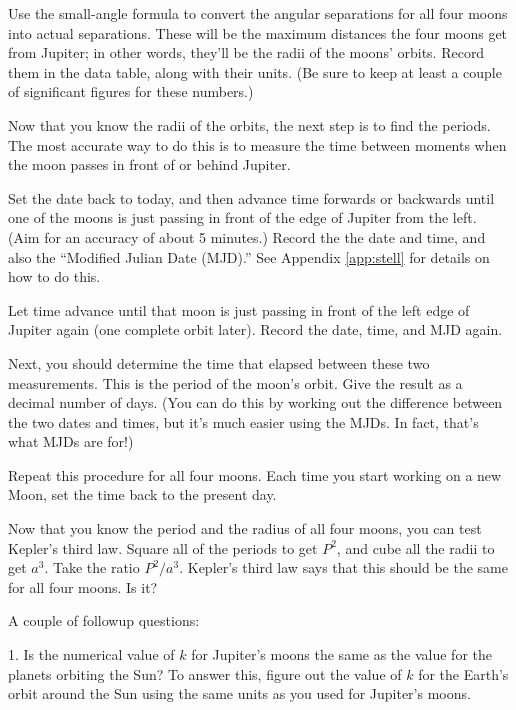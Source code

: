 \vskip 1in

Use the small-angle formula to convert the angular separations
for all four moons into actual separations.  These will be the
maximum distances the four moons get from Jupiter; in other words,
they'll be the radii of the moons' orbits.  Record them in the data table,
along with their units. (Be sure to keep at least a couple of significant
figures for these numbers.)

Now that you know the radii of the orbits, the next step is to find the
periods.  The most accurate way to do this is to measure the time between
moments when the moon passes in front of or behind Jupiter.

Set the date back to today, and then advance time
forwards or backwards until one of the moons is just
passing in front of the edge of Jupiter from the left.  (Aim for
an accuracy of about 5 minutes.)  Record
the the date and time, and also the ``Modified Julian Date (MJD).''
See Appendix \ref{app:stell} for details on how to do this.

Let time advance until that moon
is just passing in front of the left edge of Jupiter again (one complete
orbit later).  Record the date, time, and MJD again.  

Next, you should determine the time that elapsed
between these two measurements.  This is the period of the moon's orbit.
Give the result as a decimal number of days. (You can do this by working
out the difference between the two dates and times, but it's much easier
using the MJDs. In fact, that's what MJDs are for!)

Repeat this procedure for all four moons. Each time you start working on a
new Moon, set the time back to the present day.

Now that you know the period and the radius of all four moons,
you can test Kepler's third law.  Square all of the periods to get $P^2$,
and cube all the radii to get $a^3$.  Take the ratio $P^2/a^3$.
Kepler's third law says that this should be the same for all four
moons.  Is it?

\vskip 1in

A couple of followup questions:

1. Is the numerical value of $k$ for Jupiter's moons the same
as the value for the planets orbiting the Sun?  To answer this,
figure out the value of $k$ for the Earth's orbit around the
Sun using the same units as you used for Jupiter's moons.

\vskip 2.6in

